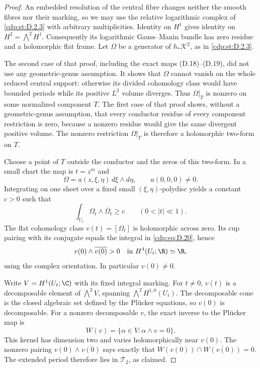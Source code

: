 \begin{proof}
An embedded resolution of the central fibre changes neither
the smooth fibres nor their marking, so we may use the relative
logarithmic complex of \ref{cdp:st:D.2.3} with arbitrary multiplicities.
Identity on $H^1$ gives identity on $H^2=\bigwedge^2H^1$.
Consequently its logarithmic Gauss--Manin bundle has zero
residue and a holomorphic flat frame. Let $\Omega$ be a
generator of $h_*\mathscr K^2$, as in \ref{cdp:st:D.2.3}.

The second case of that proof, including the exact maps
(D.18)--(D.19), did not use any geometric-genus assumption.
It shows that $\Omega$ cannot vanish on the whole reduced
central support: otherwise its divided cohomology class would
have bounded periods while its positive $L^2$ volume diverges.
Thus $\Omega|_T$ is nonzero on some normalized component $T$.
The first case of that proof shows, without a geometric-genus
assumption, that every conductor residue of every component
restriction is zero, because a nonzero residue would give the
same divergent positive volume. The nonzero restriction
$\Omega|_T$ is therefore a holomorphic two-form on $T$.

Choose a point of $T$ outside the conductor and the zeros of
this two-form. In a small chart the map is $t=z^m$ and
\[
 \Omega=a(z,\xi,\eta)\,d\xi\wedge d\eta,
 \qquad a(0,0,0)\ne0.
\]
Integrating on one sheet over a fixed small
$(\xi,\eta)$-polydisc yields a constant $c>0$ such that
\[
 \int_{U_t}\Omega_t\wedge\overline{\Omega_t}\ge c
 \qquad(0<|t|\ll1).
\tag{D.20}\label{cdp:eq:D.20}
\]
The flat cohomology class $v(t)=[\Omega_t]$ is holomorphic
across zero. Its cup pairing with its conjugate equals the
integral in \eqref{cdp:eq:D.20}, hence
\[
 v(0)\wedge\overline{v(0)}>0
 \quad\hbox{in }H^4(U_t;\R)\simeq\R,
\]
using the complex orientation. In particular $v(0)\ne0$.

Write $V=H^1(U_t;\C)$ with its fixed integral marking.
For $t\ne0$, $v(t)$ is a decomposable element of
$\bigwedge^2V$, spanning $\bigwedge^2H^{1,0}(U_t)$.
The decomposable cone is the closed algebraic set defined by
the Pl\"ucker equations, so $v(0)$ is decomposable. For a
nonzero decomposable $v$, the exact inverse to the Pl\"ucker
map is
\[
 W(v)=\{\alpha\in V:\alpha\wedge v=0\}.
\]
This kernel has dimension two and varies holomorphically near
$v(0)$. The nonzero pairing
$v(0)\wedge\overline{v(0)}$ says exactly that
$W(v(0))\cap\overline{W(v(0))}=0$. The extended period
therefore lies in $\mathcal T_2$, as claimed.


\end{proof}
